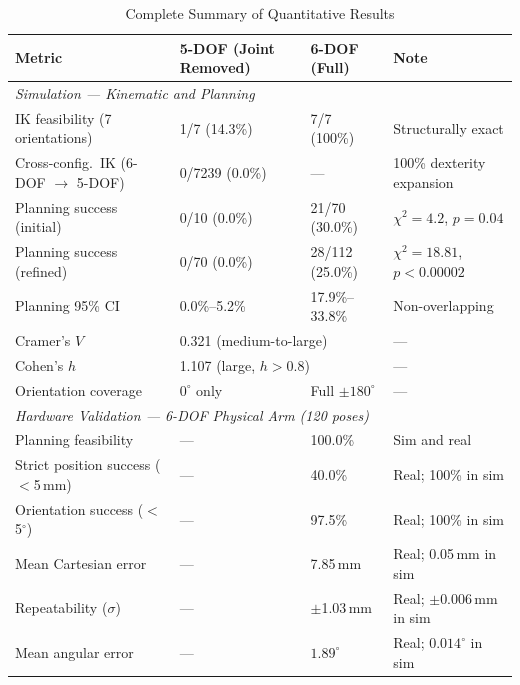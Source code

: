 \documentclass[conference]{IEEEtran}
\begin{document}
	\begin{table}[t]
		\centering
		\caption{Complete Summary of Quantitative Results}
		\label{tab:summary}
		\renewcommand{\arraystretch}{1.3}
		\small
		\begin{tabular}{llll}
			\toprule
			\textbf{Metric} & \textbf{5-DOF (Joint Removed)} & \textbf{6-DOF (Full)} & \textbf{Note} \\
			\midrule
			\multicolumn{4}{l}{\textit{Simulation --- Kinematic and Planning}} \\
			IK feasibility (7 orientations)              & 1/7 (14.3\%)    & 7/7 (100\%)          & Structurally exact \\
			Cross-config.\ IK (6-DOF $\to$ 5-DOF)       & 0/7239 (0.0\%)  & ---                  & 100\% dexterity expansion \\
			Planning success (initial)                   & 0/10 (0.0\%)    & 21/70 (30.0\%)       & $\chi^2=4.2$, $p=0.04$ \\
			Planning success (refined)                   & 0/70 (0.0\%)    & 28/112 (25.0\%)      & $\chi^2=18.81$, $p<0.00002$ \\
			Planning 95\% CI                             & 0.0\%--5.2\%    & 17.9\%--33.8\%       & Non-overlapping \\
			Cramer's $V$                                 & \multicolumn{2}{l}{0.321 (medium-to-large)} & --- \\
			Cohen's $h$                                  & \multicolumn{2}{l}{1.107 (large, $h>0.8$)}  & --- \\
			Orientation coverage                         & $0^\circ$ only  & Full $\pm180^\circ$  & --- \\
			\midrule
			\multicolumn{4}{l}{\textit{Hardware Validation --- 6-DOF Physical Arm (120 poses)}} \\
			Planning feasibility                         & ---  & 100.0\%        & Sim and real \\
			Strict position success ($<$5\,mm)           & ---  & 40.0\%         & Real; 100\% in sim \\
			Orientation success ($<$5$^\circ$)           & ---  & 97.5\%         & Real; 100\% in sim \\
			Mean Cartesian error                         & ---  & 7.85\,mm       & Real; 0.05\,mm in sim \\
			Repeatability ($\sigma$)                     & ---  & $\pm$1.03\,mm  & Real; $\pm$0.006\,mm in sim \\
			Mean angular error                           & ---  & $1.89^\circ$   & Real; $0.014^\circ$ in sim \\
			\bottomrule
		\end{tabular}
	\end{table}
	
\end{document}
